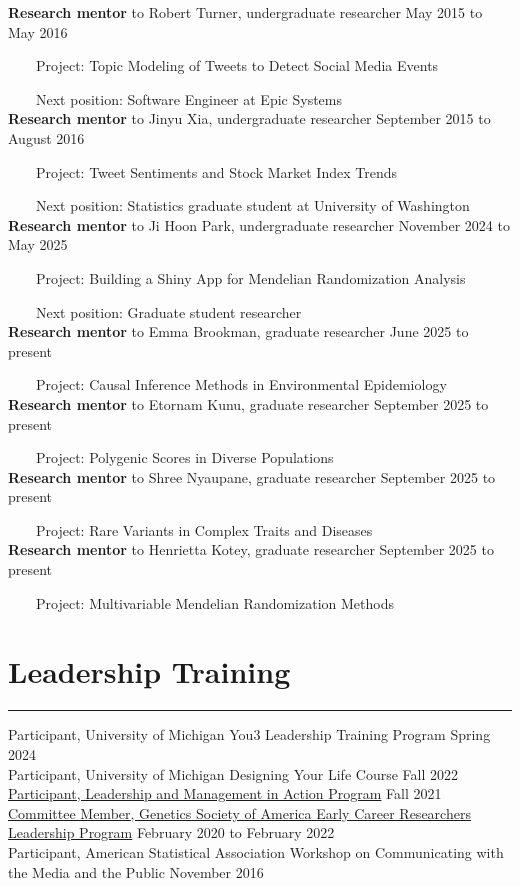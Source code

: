 \documentclass[
  10pt,
]
{article}
\begin{document}
\normalsize \textbf{Research mentor} to Robert Turner, undergraduate
researcher \hfill May 2015 to May 2016\\
\strut ~~~~Project: Topic Modeling of Tweets to Detect Social Media
Events\\
\strut ~~~~Next position: Software Engineer at Epic Systems\\
\normalsize \textbf{Research mentor} to Jinyu Xia, undergraduate
researcher \hfill September 2015 to August 2016\\
\strut ~~~~Project: Tweet Sentiments and Stock Market Index Trends\\
\strut ~~~~Next position: Statistics graduate student at University of
Washington\\
\normalsize \textbf{Research mentor} to Ji Hoon Park, undergraduate
researcher \hfill November 2024 to May 2025\\
\strut ~~~~Project: Building a Shiny App for Mendelian Randomization
Analysis\\
\strut ~~~~Next position: Graduate student researcher\\
\normalsize \textbf{Research mentor} to Emma Brookman, graduate
researcher \hfill June 2025 to present\\
\strut ~~~~Project: Causal Inference Methods in Environmental
Epidemiology\\
\normalsize \textbf{Research mentor} to Etornam Kunu, graduate
researcher \hfill September 2025 to present\\
\strut ~~~~Project: Polygenic Scores in Diverse Populations\\
\normalsize \textbf{Research mentor} to Shree Nyaupane, graduate
researcher \hfill September 2025 to present\\
\strut ~~~~Project: Rare Variants in Complex Traits and Diseases\\
\normalsize \textbf{Research mentor} to Henrietta Kotey, graduate
researcher \hfill September 2025 to present\\
\strut ~~~~Project: Multivariable Mendelian Randomization Methods

\section{Leadership Training}\label{leadership-training}

\hrule

\normalsize Participant, University of Michigan You3 Leadership Training
Program \hfill Spring 2024\\
\normalsize Participant, University of Michigan Designing Your Life
Course \hfill Fall 2022\\
\normalsize \href{https://drive.google.com/file/d/1xp9-gjLDxlrPtHyF4FqTf9_q0-aL47av/view}{Participant,
Leadership and Management in Action Program} \hfill Fall 2021\\
\normalsize \href{https://genetics-gsa.org/career-development/early-career-leadership/}{Committee
Member, Genetics Society of America Early Career Researchers Leadership
Program} \hfill February 2020 to February 2022\\
\normalsize Participant, American Statistical Association Workshop on
Communicating with the Media and the Public \hfill November 2016
\end{document}
